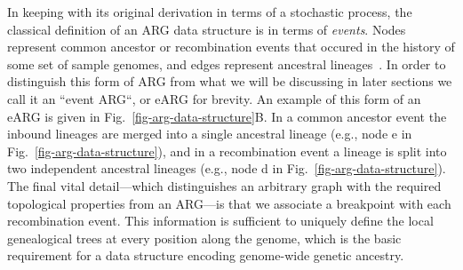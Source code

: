 \documentclass{article}
\newcommand{\noderef}[1]{\textsf{#1}}
\begin{document}
In keeping with its original derivation in terms of a stochastic
process, the classical definition of an ARG data structure is
in terms of \emph{events}. Nodes represent
common ancestor or recombination events that occured in the
history of some set of sample genomes, and edges represent ancestral
lineages~\citep{griffiths1996ancestral}.
In order to distinguish this form of ARG from what we will be discussing
in later sections we call it an ``event ARG``, or eARG for brevity.
An example of this form of an eARG
is given in Fig.~\ref{fig-arg-data-structure}B.
In a common ancestor event the inbound lineages are merged into a
single ancestral lineage (e.g., node \noderef{e}
in Fig.~\ref{fig-arg-data-structure}), and in a recombination
event a lineage is split into two independent
ancestral lineages (e.g., node \noderef{d}
in Fig.~\ref{fig-arg-data-structure}). The final vital
detail---which distinguishes an arbitrary graph with the required topological
properties from an ARG---is that we associate a breakpoint with each recombination
event. This information is sufficient to uniquely
define the local genealogical trees at every position along the genome,
which is the basic requirement for a data structure encoding
genome-wide genetic ancestry.
\end{document}
